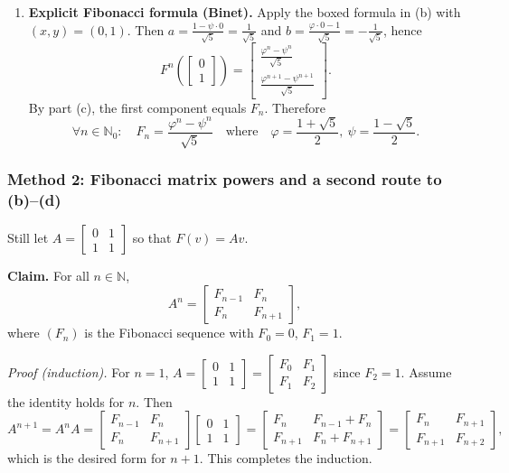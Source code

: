 \documentclass[12pt]{article}
\newcommand{\F}{\mathbb{F}}
\begin{document}
\begin{enumerate}[label=(\alph*)]
\item \textbf{Explicit Fibonacci formula (Binet).}
Apply the boxed formula in (b) with $(x,y)=(0,1)$.
Then $a=\frac{1-\psi\cdot 0}{\sqrt5}=\frac{1}{\sqrt5}$ and $b=\frac{\varphi\cdot 0-1}{\sqrt5}=-\frac{1}{\sqrt5}$, hence
\[
F^n\!\left(\begin{bmatrix}0\\1\end{bmatrix}\right)
=
\begin{bmatrix}
\frac{\varphi^n-\psi^n}{\sqrt5}\\[0.2em]
\frac{\varphi^{n+1}-\psi^{n+1}}{\sqrt5}
\end{bmatrix}.
\]
By part (c), the first component equals $F_n$. Therefore
\[
\boxed{\,\forall n\in\mathbb{N}_0:\quad
F_n=\frac{\varphi^n-\psi^n}{\sqrt5}
\quad\text{where}\quad
\varphi=\frac{1+\sqrt5}{2},\ \psi=\frac{1-\sqrt5}{2}.
\,}
\]
\end{enumerate}

\subsubsection{Method 2: Fibonacci matrix powers and a second route to (b)--(d)}
Still let $A=\begin{bmatrix}0&1\\1&1\end{bmatrix}$ so that $F(v)=Av$.

\medskip
\noindent\textbf{Claim.} For all $n\in\mathbb{N}$,
\[
A^n=
\begin{bmatrix}
F_{n-1} & F_n\\
F_n & F_{n+1}
\end{bmatrix},
\]
where $(F_n)$ is the Fibonacci sequence with $F_0=0$, $F_1=1$.

\emph{Proof (induction).}
For $n=1$, $A=\begin{bmatrix}0&1\\1&1\end{bmatrix}=\begin{bmatrix}F_0&F_1\\F_1&F_2\end{bmatrix}$ since $F_2=1$.
Assume the identity holds for $n$. Then
\[
A^{n+1}=A^nA=
\begin{bmatrix}
F_{n-1} & F_n\\
F_n & F_{n+1}
\end{bmatrix}
\begin{bmatrix}0&1\\1&1\end{bmatrix}
=
\begin{bmatrix}
F_n & F_{n-1}+F_n\\
F_{n+1} & F_n+F_{n+1}
\end{bmatrix}
=
\begin{bmatrix}
F_n & F_{n+1}\\
F_{n+1} & F_{n+2}
\end{bmatrix},
\]
which is the desired form for $n+1$. This completes the induction.
\end{document}
